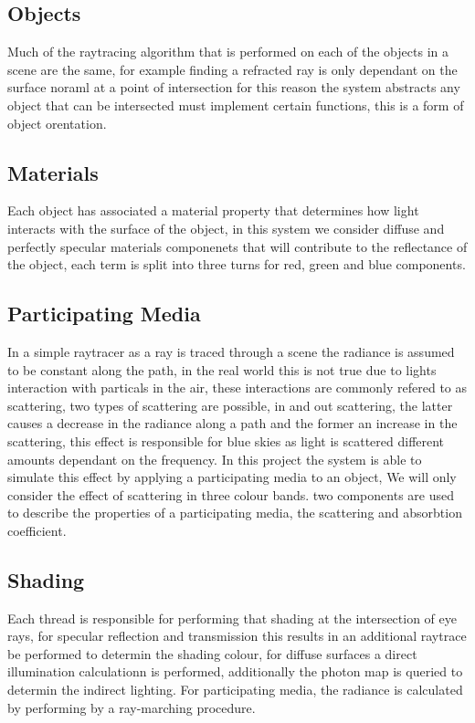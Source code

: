 \begin{figure}
\end{figure}

\subsection{Objects}
Much of the raytracing algorithm that is performed on each of the
objects in a scene are the same, for example finding a refracted
ray is only dependant on the surface noraml at a point of intersection
for this reason the system abstracts any object that can be intersected
must implement certain functions, this is a form of object orentation.

\subsection{Materials}
Each object has associated a material property that determines how light interacts with the surface of the
object, in this system we consider diffuse and perfectly specular materials componenets that will contribute
to the reflectance of the object, each term is split into three turns for red, green and blue components.

\subsection{Participating Media}
In a simple raytracer as a ray is traced through a scene the radiance is assumed to be constant along the path,
in the real world this is not true due to lights interaction with particals in the air, these interactions
are commonly refered to as scattering, two types of scattering are possible, in and out scattering, the latter
causes a decrease in the radiance along a path and the former an increase in the scattering, this effect is
responsible for blue skies as light is scattered different amounts dependant on the frequency. In this project
the system is able to simulate this effect by applying a participating media to an object, We will only consider
the effect of scattering in three colour bands. two components are used to describe the
properties of a participating media, the scattering and absorbtion coefficient. 

\subsection{Shading}
Each thread is responsible for performing that shading at the intersection of eye rays, for specular reflection
and transmission this results in an additional raytrace be performed to determin the shading colour, for diffuse
surfaces a direct illumination calculationn is performed, additionally the photon map is queried to determin
the indirect lighting. For participating media, the radiance is calculated by performing by a ray-marching
procedure.
